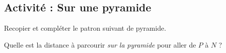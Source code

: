 
\subsection*{Activité : Sur une pyramide}

Recopier et compléter le patron suivant de pyramide.

\begin{center}
   
\end{center}


Quelle est la distance à parcourir \emph{sur la pyramide} pour aller de \( P\) à \( N\) ?


